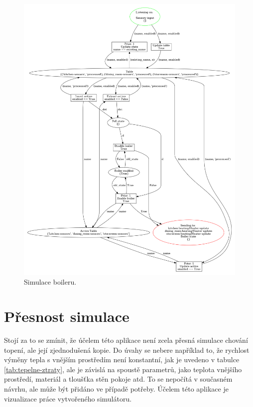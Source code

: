 \begin{figure}[httb]
 \centering
 \includegraphics[width=\textwidth]{obrazky-figures/boiler-logic.png}
 \caption{Simulace boileru.}
 \label{boiler-logic-viz}
\end{figure}

\section{Přesnost simulace}

Stojí za to se zmínit, že účelem této aplikace není zcela přesná simulace chování topení, ale její zjednodušená kopie. Do úvahy se nebere například to, že rychlost výměny tepla s vnějším prostředím není konstantní, jak je uvedeno v tabulce \ref{tab:tepelne-ztraty}, ale je závislá na spoustě parametrů, jako teplota vnějšího prostředí, materiál a tloušťka stěn pokoje atd. To se nepočítá v současném návrhu, ale může být přidáno ve případě potřeby. Účelem této aplikace je vizualizace práce vytvořeného simulátoru.

